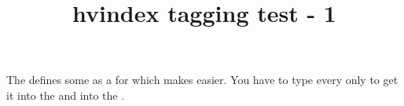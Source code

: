 \documentclass{article}
\title{hvindex tagging test - 1}
\begin{document}
The   defines some 
as a  for
which makes  easier. You have to type every
 only  to get it into the 
and into the .





\printindex
\end{document}
